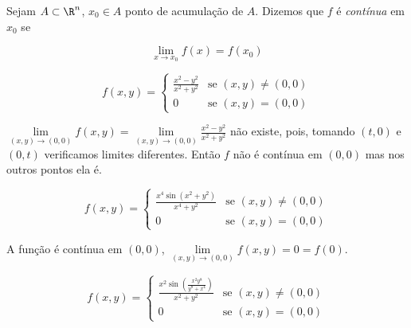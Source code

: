 \documentclass[11pt, oneside, a4paper]{gsm-l}
\begin{document}
\begin{defi}
    Sejam $A \subset \R^n$, $x_0 \in A$ ponto de acumulação de $A$. Dizemos que $f$ é \textit{contínua} em $x_0$ se

\[\boxed{
    \mathop {\lim }\limits_{x \to x_0 } f\left( x \right) = f\left( {x_0 } \right)}
\]

\end{defi}

\begin{exem}
\begin{equation*}
f(x,y)=\left\{ \begin{array}{cl}\displaystyle
        \frac{{x^2  - y^2 }}{{x^2  + y^2 }} & \textrm{se }\left( {x,y} \right) \ne \left( {0,0} \right)\\
        0 & \textrm{se }\left( {x,y} \right) = \left( {0,0} \right)\end{array}\right.
\end{equation*}
\end{exem}

\begin{sol}
    $\displaystyle \mathop {\lim }\limits_{\left( {x,y} \right) \to \left( {0,0} \right)} f\left( {x,y} \right) = \mathop {\lim }\limits_{\left( {x,y} \right) \to \left( {0,0} \right)} \frac{{x^2  - y^2 }}{{x^2  + y^2 }}$ não existe, pois, tomando $(t,0)$ e $(0,t)$ verificamos limites diferentes. Então $f$ não é contínua em $(0,0)$ mas nos outros pontos ela é.
\end{sol}

\begin{exem}
\begin{equation*}
f(x,y)=\left\{ \begin{array}{cl}\displaystyle
\frac{{x^4 \sin \left( {x^2  + y^2 } \right)}}
        {{x^4  + y^2 }} & \textrm{se }\left( {x,y} \right) \ne \left( {0,0} \right)\\
        0 & \textrm{se }\left( {x,y} \right) = \left( {0,0} \right)\end{array}\right.
\end{equation*}

\end{exem}

\begin{sol}
    A função é contínua em $(0,0)$, $\mathop {\lim }\limits_{\left( {x,y} \right) \to \left( {0,0} \right)} f\left( {x,y} \right) = 0 = f\left( 0 \right)$.
\end{sol}

\begin{exem}
\begin{equation*}
f(x,y)=\left\{ \begin{array}{cl}\displaystyle
\frac{{x^2 \sin \left( \displaystyle {\frac{{x^2 y^8 }}
        {{y^8  + x^4 }}} \right)}}{{x^2  + y^2 }} & \textrm{se }\left( {x,y} \right) \ne \left( {0,0} \right)\\
        0 & \textrm{se }\left( {x,y} \right) = \left( {0,0} \right)\end{array}\right.
\end{equation*}

\end{exem}
\end{document}

